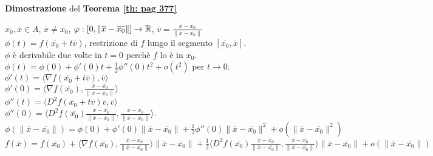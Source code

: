 \begin{dembar}
	\textbf{Dimostrazione} del \textbf{Teorema \ref{th: pag 377}}
	
	$\overline{x_0}, \overline{x}\in A$, $\overline{x}\neq \overline{x_0}$, $\varphi:[0, \|\overline{x}-\overline{x_0}\|]\rightarrow \mathbb{R}$, $\overline{v}=\frac{\overline{x}-\overline{x_0}}{\|\overline{x}-\overline{x_0}\|}$\\
	$\phi(t)=f(\overline{x_0}+t\overline{v})$, restrizione di $f$ lungo il segmento $[\overline{x_0},\overline{x}]$.\\
	$\phi$ è derivabile due volte in $t=0$ perchè $f$ lo è in $\overline{x_0}$.\\
	$\phi(t)=\phi(0)+\phi'(0)t+\frac{1}{2}\phi''(0)t^2+o(t^2)$ per $t \rightarrow 0$.\\
	$\phi'(t)=\langle\nabla f(\overline{x_0}+t\overline{v}),\overline{v}\rangle$\\
	$\phi'(0)=\langle \nabla f(\overline{x_0}), \frac{\overline{x}-\overline{x_0}}{\|\overline{x}-\overline{x_0}\|}\rangle$\\
	$\phi''(t)=\langle D^2f(\overline{x_0}+t\overline{v})\overline{v},\overline{v} \rangle$\\
	$\phi''(0)=\langle D^2 f(\overline{x_0})\frac{\overline{x}-\overline{x_0}}{\|\overline{x}-\overline{x_0}\|}, \frac{\overline{x}-\overline{x_0}}{\|\overline{x}-\overline{x_0}\|}\rangle$.\\
	$\phi(\|\overline{x}-\overline{x_0}\|)=\phi(0)+\phi'(0) \|\overline{x}-\overline{x_0}\|+\frac{1}{2}\phi''(0)\| \overline{x}-\overline{x_0}\|^2+o(\|\overline{x}-\overline{x_0}\|^2)$\\
	$f(\overline{x})=f(\overline{x_0})+\langle \nabla f(\overline{x_0}), \frac{\overline{x}-\overline{x_0}}{\|\overline{x}-\overline{x_0}\|} \rangle \|\overline{x} -\overline{x_0}\|+ \frac{1}{2}\langle D^2 f(\overline{x_0})\frac{\overline{x}-\overline{x_0}}{\|\overline{x}-\overline{x_0}\|},\frac{\overline{x}-\overline{x_0}}{\|\overline{x}-\overline{x_0}\|}  \rangle \|\overline{x}-\overline{x_0}\|+o(\|\overline{x}-\overline{x_0}\|)$
\end{dembar}


